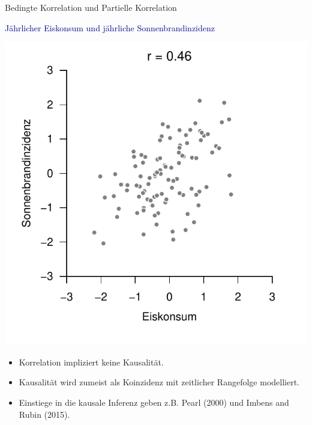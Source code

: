 \documentclass[
  8pt,
  ignorenonframetext,
]{beamer}
\providecommand{\tightlist}{%
  \setlength{\itemsep}{0pt}\setlength{\parskip}{0pt}}
\begin{document}
\begin{frame}{Bedingte Korrelation und Partielle Korrelation}
\protect\hypertarget{bedingte-korrelation-und-partielle-korrelation}{}
\center

\textcolor{darkblue}{Jährlicher Eiskonsum und jährliche Sonnenbrandinzidenz}

\begin{center}\includegraphics[width=0.5\linewidth]{2_Abbildungen/alm_2_bpr_beispiel} \end{center}
\small
\vspace{-2mm}

\begin{itemize}
\tightlist
\item
  Korrelation impliziert keine Kausalität.
\item
  Kausalität wird zumeist als Koinzidenz mit zeitlicher Rangefolge
  modelliert.
\item
  Einstiege in die kausale Inferenz geben z.B. Pearl (2000) und Imbens
  and Rubin (2015).
\end{itemize}
\end{frame}
\end{document}
